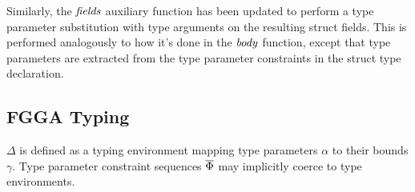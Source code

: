 Similarly, the $\mathit{fields}$ auxiliary function has been updated to perform a type
parameter substitution with type arguments on the resulting struct fields. This
is performed analogously to how it's done in the $\mathit{body}$ function, except that
type parameters are extracted from the type parameter constraints in the struct
type declaration.



\subsection{FGGA Typing}

$\Delta$ is defined as a typing environment mapping type parameters $\alpha$
to their bounds $\gamma$. Type parameter constraint sequences $\overline{\Phi}$ may
implicitly coerce to type environments.



